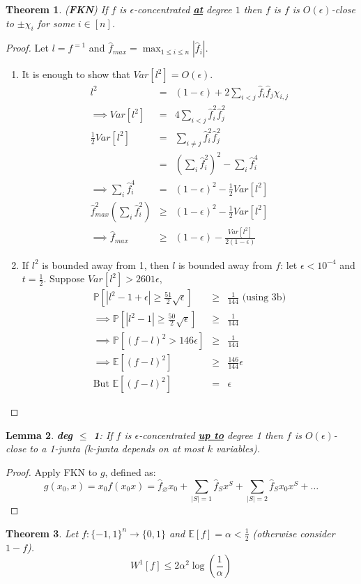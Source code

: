 \documentclass{sig-alternate}
\newtheorem{theorem}{Theorem}[section]
\newtheorem{lemma}[theorem]{Lemma}
\begin{document}
\begin{theorem}({\bf FKN})
If $f$ is $\epsilon$-concentrated \underline{\textbf{at}} degree $1$ then $f$ is $f$ is $O(\epsilon)$-close to $\pm\chi_i$ for some $i \in [n]$.
\end{theorem}
\begin{proof}
Let $l = f^{=1}$ and $\hat{f}_{max} = \max_{1 \leq i \leq n}|\hat{f}_i|$.
\begin{enumerate} 
\item It is enough to show that $Var[l^2] = O(\epsilon)$.
	\begin{eqnarray*}
	l^2 & = & (1-\epsilon) + 2\sum_{i < j}\hat{f}_i\hat{f}_j\chi_{i,j} \\
	\implies Var[l^2] & = & 4\sum_{i < j}\hat{f}^2_i\hat{f}^2_j \\
	\frac{1}{2}Var[l^2] & = & \sum_{i \neq j}\hat{f}^2_i\hat{f}^2_j \\
	& = & (\sum_i \hat{f}^2_i)^2 - \sum_i\hat{f}^4_i \\
	\implies \sum_i\hat{f}^4_i & = & (1-\epsilon)^2 - \frac{1}{2}Var[l^2] \\
	\hat{f}_{max}^2(\sum_i \hat{f}^2_i) & \geq & (1 - \epsilon)^2 - \frac{1}{2}Var[l^2] \\
	\implies \hat{f}_{max} & \geq & (1 - \epsilon) - \frac{Var[l^2]}{2(1 - \epsilon)}
	\end{eqnarray*}
\item If $l^2$ is bounded away from 1, then $l$ is bounded away from $f$: let $\epsilon < 10^{-4}$ and $t = \frac{1}{2}$. Suppose $Var[l^2] > 2601\epsilon$, \begin{eqnarray*}
	\mathbb{P}[|l^2 - 1 + \epsilon| \geq \frac{51}{2}\sqrt{\epsilon}] & \geq & \frac{1}{144}  \mbox{ (using 3b)}\\
	\implies \mathbb{P}[|l^2 - 1| \geq \frac{50}{2}\sqrt{\epsilon}] & \geq & \frac{1}{144} \\
	\implies \mathbb{P}[(f - l)^2 > 146\epsilon] & \geq & \frac{1}{144} \\
	\implies \mathbb{E}[(f-l)^2] & \geq & \frac{146}{144}\epsilon \\
	\mbox{But } \mathbb{E}[(f-l)^2] & = & \epsilon
	\end{eqnarray*}
\end{enumerate}
\end{proof}

\begin{lemma}
\textit{\textbf{deg $\leq$ 1}}: If $f$ is $\epsilon$-concentrated \underline{\textbf{up to}} degree 1 then $f$ is $O(\epsilon)$-close to a 1-junta ($k$-junta depends on at most $k$ variables).
\end{lemma}
\begin{proof} Apply FKN to $g$, defined as:
\[g(x_0,x) = x_0f(x_0x) = \hat{f}_{\varnothing}x_0 + \sum_{|S| = 1}\hat{f}_Sx^{S} + \sum_{|S| = 2}\hat{f}_Sx_0x^S + \ldots\]
\end{proof}
\begin{theorem}
Let $f:\{-1,1\}^n \rightarrow \{0,1\}$ and $\mathbb{E}[f] = \alpha < \frac{1}{2}$ (otherwise consider $1 - f$). 
\[W^1[f] \leq 2\alpha^2\log(\frac{1}{\alpha})\]
\end{theorem}






\end{document}
